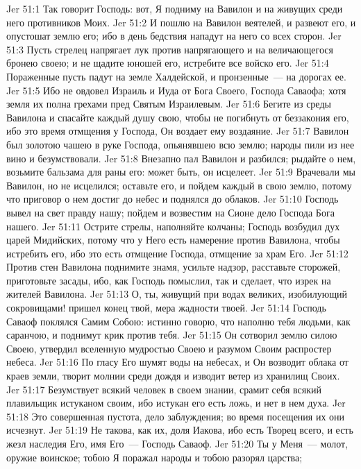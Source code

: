 \vs Jer 51:1 Так говорит Господь: вот, Я подниму на Вавилон и на живущих среди него противников Моих.
\vs Jer 51:2 И пошлю на Вавилон веятелей, и развеют его, и опустошат землю его; ибо в день бедствия нападут на него со всех сторон.
\vs Jer 51:3 Пусть стрелец напрягает лук против напрягающего  и на величающегося бронею своею; и не щадите юношей его, истребите все войско его.
\vs Jer 51:4 Пораженные пусть падут на земле Халдейской, и пронзенные~--- на дорогах ее.
\vs Jer 51:5 Ибо не овдовел Израиль и Иуда от Бога Своего, Господа Саваофа; хотя земля их полна грехами пред Святым Израилевым.
\vs Jer 51:6 Бегите из среды Вавилона и спасайте каждый душу свою, чтобы не погибнуть от беззакония его, ибо это время отмщения у Господа, Он воздает ему воздаяние.
\vs Jer 51:7 Вавилон был золотою чашею в руке Господа, опьянявшею всю землю; народы пили из нее вино и безумствовали.
\vs Jer 51:8 Внезапно пал Вавилон и разбился; рыдайте о нем, возьмите бальзама для раны его: может быть, он исцелеет.
\vs Jer 51:9 Врачевали мы Вавилон, но не исцелился; оставьте его, и пойдем каждый в свою землю, потому что приговор о нем достиг до небес и поднялся до облаков.
\vs Jer 51:10 Господь вывел на свет правду нашу; пойдем и возвестим на Сионе дело Господа Бога нашего.
\vs Jer 51:11 Острите стрелы, наполняйте колчаны; Господь возбудил дух царей Мидийских, потому что у Него есть намерение против Вавилона, чтобы истребить его, ибо это есть отмщение Господа, отмщение за храм Его.
\vs Jer 51:12 Против стен Вавилона поднимите знамя, усильте надзор, расставьте сторожей, приготовьте засады, ибо, как Господь помыслил, так и сделает, что изрек на жителей Вавилона.
\vs Jer 51:13 О, ты, живущий при водах великих, изобилующий сокровищами! пришел конец твой, мера жадности твоей.
\vs Jer 51:14 Господь Саваоф поклялся Самим Собою: истинно говорю, что наполню тебя людьми, как саранчою, и поднимут крик против тебя.
\vs Jer 51:15 Он сотворил землю силою Своею, утвердил вселенную мудростью Своею и разумом Своим распростер небеса.
\vs Jer 51:16 По гласу Его шумят воды на небесах, и Он возводит облака от краев земли, творит молнии среди дождя и изводит ветер из хранилищ Своих.
\vs Jer 51:17 Безумствует всякий человек в своем знании, срамит себя всякий плавильщик истуканом своим, ибо истукан его есть ложь, и нет в нем духа.
\vs Jer 51:18 Это совершенная пустота, дело заблуждения; во время посещения их они исчезнут.
\vs Jer 51:19 Не такова, как их, доля Иакова, ибо  есть Творец всего, и  есть жезл наследия Его, имя Его~--- Господь Саваоф.
\vs Jer 51:20 Ты у Меня~--- молот, оружие воинское; тобою Я поражал народы и тобою разорял царства;
